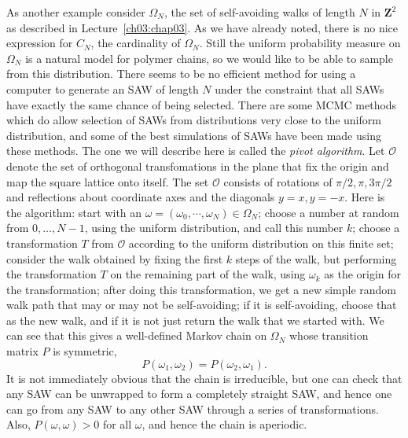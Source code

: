 \documentclass{stml-l}
\theoremstyle{definition}
\numberwithin{equation}{chapter}
\numberwithin{figure}{chapter}
\numberwithin{figure}{section}
\begin{document}
As another example consider $\Omega_{N}$, the set of self-avoiding
walks of length $N$ in $\mathbf{Z}^{2}$ as described in
Lecture~\ref{ch03:chap03}. As we have already noted, there is no
nice expression for $C_{N}$, the cardinality of $\Omega_{N}$. Still
the uniform probability measure on $\Omega_{N}$ is a natural model
for polymer chains, so we would like to be able to sample from this
distribution. There seems to be no efficient method for using a
computer to generate an SAW of length $N$ under the constraint that
all SAWs have exactly the same chance of being selected. There are
some MCMC methods which do allow selection of SAWs from
distributions very close to the uniform distribution, and some of
the best simulations of SAWs have been made using these methods. The
one we will describe here is called the \emph{pivot algorithm}. Let
$\mathcal{O}$ denote the set of orthogonal transfomations in the
plane that fix the origin and map the square lattice onto itself.
The set $\mathcal{O}$ consists of rotations of $\pi/2,\pi,3\pi/2$
and reflections about coordinate axes and the diagonals $y=x,y=-x$.
Here is the algorithm: start with an $\omega
=(\omega_{0},\cdots,\omega_{N})\in\Omega_{N}$; choose a number at
random from $0,\ldots,N-1$, using the uniform distribution, and call
this number $k$; choose a transformation $T$ from $\mathcal{O}$
according to the uniform distribution on this finite set; consider
the walk obtained by fixing the first $k$ steps of the walk, but
performing the transformation $T$ on the remaining part of the walk,
using $\omega_{k}$ as the origin for the transformation; after doing
this transformation, we get a new simple random walk path that may
or may not be self-avoiding; if it is self-avoiding, choose that as
the new walk, and if it is not just return the walk that we started
with. We can see that this gives a well-defined Markov chain on
$\Omega_{N}$ whose transition matrix $P$ is symmetric,
\begin{equation*}
P(\omega_{1},\omega_{2})=P(\omega_{2},\omega_{1}).
\end{equation*}
It is not immediately obvious that the chain is irreducible, but one
can check that any SAW can be unwrapped to form a completely
straight SAW, and hence one can go from any SAW to any other SAW
through a series of transformations. Also, $P(\omega,\omega)>0$ for
all $\omega$, and hence the chain is aperiodic.
\end{document}
